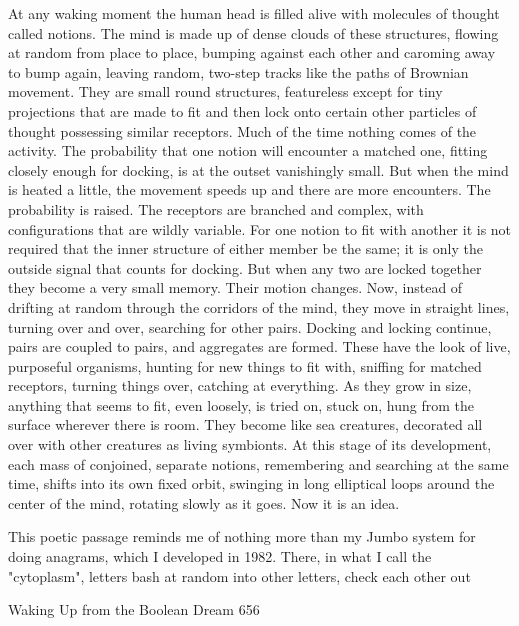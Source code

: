           At any waking moment the human head is filled alive with molecules of
  thought called notions. The mind is made up of dense clouds of these structures,
  flowing at random from place to place, bumping against each other and
  caroming away to bump again, leaving random, two-step tracks like the paths of
  Brownian movement. They are small round structures, featureless except for
  tiny projections that are made to fit and then lock onto certain other particles of
  thought possessing similar receptors. Much of the time nothing comes of the
  activity. The probability that one notion will encounter a matched one, fitting
  closely enough for docking, is at the outset vanishingly small.
          But when the mind is heated a little, the movement speeds up and there
  are more encounters. The probability is raised.
          The receptors are branched and complex, with configurations that are
  wildly variable. For one notion to fit with another it is not required that the inner
  structure of either member be the same; it is only the outside signal that counts
  for docking. But when any two are locked together they become a very small
  memory. Their motion changes. Now, instead of drifting at random through the
  corridors of the mind, they move in straight lines, turning over and over,
  searching for other pairs. Docking and locking continue, pairs are coupled to
  pairs, and aggregates are formed. These have the look of live, purposeful
  organisms, hunting for new things to fit with, sniffing for matched receptors,
  turning things over, catching at everything. As they grow in size, anything that
  seems to fit, even loosely, is tried on, stuck on, hung from the surface wherever
  there is room. They become like sea creatures, decorated all over with other
  creatures as living symbionts.
          At this stage of its development, each mass of conjoined, separate
  notions, remembering and searching at the same time, shifts into its own fixed
  orbit, swinging in long elliptical loops around the center of the mind, rotating
  slowly as it goes. Now it is an idea.

         This poetic passage reminds me of nothing more than my Jumbo system for
doing anagrams, which I developed in 1982. There, in what I call the "cytoplasm",
letters bash at random into other letters, check each other out


Waking Up from the Boolean Dream                                                      656

